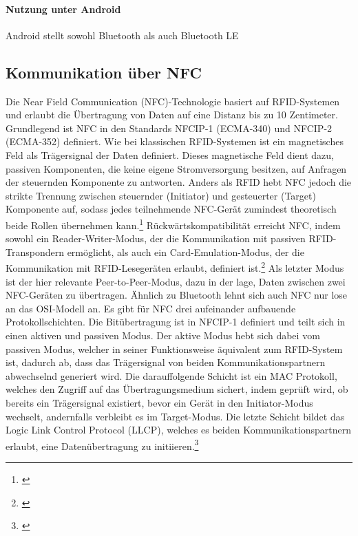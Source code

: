         \paragraph{Nutzung unter Android}
        Android stellt sowohl Bluetooth als auch Bluetooth LE

    \subsection{Kommunikation über NFC}
        Die Near Field Communication (NFC)-Technologie basiert auf RFID-Systemen und erlaubt die Übertragung von Daten auf eine Distanz bis zu 10 Zentimeter.
        Grundlegend ist NFC in den Standards NFCIP-1 (ECMA-340) und NFCIP-2 (ECMA-352) definiert. Wie bei klassischen RFID-Systemen ist ein magnetisches Feld
        als Trägersignal der Daten definiert. Dieses magnetische Feld dient dazu, passiven Komponenten, die keine eigene Stromversorgung besitzen, auf Anfragen
        der steuernden Komponente zu antworten. Anders als RFID hebt NFC jedoch die strikte Trennung zwischen steuernder (Initiator) und gesteuerter (Target) Komponente auf, sodass
        jedes teilnehmende NFC-Gerät zumindest theoretisch beide Rollen übernehmen kann.\footnote{\cite[S.89]{Langer}} Rückwärtskompatibilität erreicht NFC,
        indem sowohl ein Reader-Writer-Modus, der die Kommunikation mit passiven RFID-Transpondern ermöglicht,
        als auch ein Card-Emulation-Modus, der die Kommunikation mit RFID-Lesegeräten erlaubt, definiert ist.\footnote{\cite[S.99f.]{Langer}}
        Als letzter Modus ist der hier relevante Peer-to-Peer-Modus, dazu in der lage, Daten zwischen zwei NFC-Geräten zu übertragen.
        Ähnlich zu Bluetooth lehnt sich auch NFC nur lose an das OSI-Modell an. Es gibt für NFC drei aufeinander aufbauende Protokollschichten.
        Die Bitübertragung ist in NFCIP-1 definiert und teilt sich in einen aktiven und passiven Modus. Der aktive Modus hebt sich dabei vom passiven Modus,
        welcher in seiner Funktionsweise äquivalent zum RFID-System ist, dadurch ab, dass das Trägersignal von beiden Kommunikationspartnern abwechselnd generiert wird.
        Die darauffolgende Schicht ist ein MAC Protokoll, welches den Zugriff auf das Übertragungsmedium sichert, indem geprüft wird, ob bereits ein Trägersignal existiert,
        bevor ein Gerät in den Initiator-Modus wechselt, andernfalls verbleibt es im Target-Modus.
        Die letzte Schicht bildet das Logic Link Control Protocol (LLCP), welches es beiden Kommunikationspartnern erlaubt, eine Datenübertragung zu initiieren.\footnote{\cite[S91.f, S.97]{Langer}}

